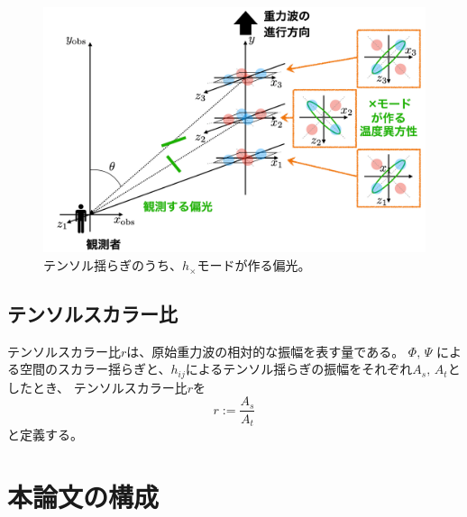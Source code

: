 \documentclass[../../main.tex]{subfiles}
\begin{document}
\begin{figure}
    \centering
    \includegraphics[width=1.0\textwidth]{intro/tensor_polarization.pdf}
    \caption{テンソル揺らぎのうち、$h_{\times}$モードが作る偏光。}
\end{figure}

\subsection{テンソルスカラー比}
テンソルスカラー比$r$は、原始重力波の相対的な振幅を表す量である。
$\Phi,\,\Psi$ による空間のスカラー揺らぎと、$h_{ij}$によるテンソル揺らぎの振幅をそれぞれ$A_{s},\,A_{t}$としたとき、
テンソルスカラー比$r$を
\begin{equation}
    r := \dfrac{A_s}{A_t}
\end{equation}
と定義する。

\section{本論文の構成}
\end{document}
